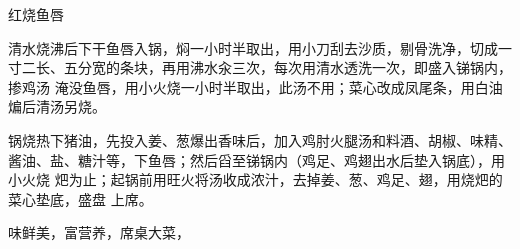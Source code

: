 \begin{recipe}{红烧鱼唇}

\ingredients


\preparation

\step 清水烧沸后下干鱼唇入锅，焖一小时半取出，用小刀刮去沙质，剔骨洗净，切成一
寸二长、五分宽的条块，再用沸水汆三次，每次用清水透洗一次，即盛入锑锅内，掺鸡汤
淹没鱼唇，用小火烧一小时半取出，此汤不用；菜心改成凤尾条，用白油煸后清汤另烧。

\step 锅烧热下猪油，先投入姜、葱爆出香味后，加入鸡肘火腿汤和料酒、胡椒、味精、
酱油、盐、糖汁等，下鱼唇；然后舀至锑锅内（鸡足、鸡翅出水后垫入锅底），用小火烧
𤆵为止；起锅前用旺火将汤收成浓汁，去掉姜、葱、鸡足、翅，用烧𤆵的菜心垫底，盛盘
上席。

\features

味鲜美，富营养，席桌大菜，

\end{recipe}

